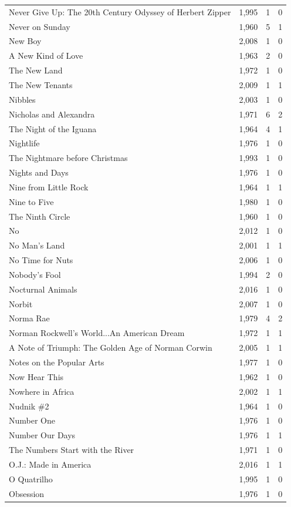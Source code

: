 \begin{tabular}{lrrr}
Never Give Up: The 20th Century Odyssey of Herbert Zipper & 1,995 & 1 & 0 \\
Never on Sunday & 1,960 & 5 & 1 \\
New Boy & 2,008 & 1 & 0 \\
A New Kind of Love & 1,963 & 2 & 0 \\
The New Land & 1,972 & 1 & 0 \\
The New Tenants & 2,009 & 1 & 1 \\
Nibbles & 2,003 & 1 & 0 \\
Nicholas and Alexandra & 1,971 & 6 & 2 \\
The Night of the Iguana & 1,964 & 4 & 1 \\
Nightlife & 1,976 & 1 & 0 \\
The Nightmare before Christmas & 1,993 & 1 & 0 \\
Nights and Days & 1,976 & 1 & 0 \\
Nine from Little Rock & 1,964 & 1 & 1 \\
Nine to Five & 1,980 & 1 & 0 \\
The Ninth Circle & 1,960 & 1 & 0 \\
No & 2,012 & 1 & 0 \\
No Man's Land & 2,001 & 1 & 1 \\
No Time for Nuts & 2,006 & 1 & 0 \\
Nobody's Fool & 1,994 & 2 & 0 \\
Nocturnal Animals & 2,016 & 1 & 0 \\
Norbit & 2,007 & 1 & 0 \\
Norma Rae & 1,979 & 4 & 2 \\
Norman Rockwell's World...An American Dream & 1,972 & 1 & 1 \\
A Note of Triumph: The Golden Age of Norman Corwin & 2,005 & 1 & 1 \\
Notes on the Popular Arts & 1,977 & 1 & 0 \\
Now Hear This & 1,962 & 1 & 0 \\
Nowhere in Africa & 2,002 & 1 & 1 \\
Nudnik \#2 & 1,964 & 1 & 0 \\
Number One & 1,976 & 1 & 0 \\
Number Our Days & 1,976 & 1 & 1 \\
The Numbers Start with the River & 1,971 & 1 & 0 \\
O.J.: Made in America & 2,016 & 1 & 1 \\
O Quatrilho & 1,995 & 1 & 0 \\
Obsession & 1,976 & 1 & 0 \\

\end{tabular}
